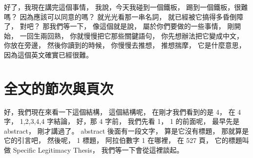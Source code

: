 \hypertarget{w02:cue:254}{}好了，我現在講完這個事情，
\hypertarget{w02:cue:255}{}我說，今天我碰到一個鐵板，
\hypertarget{w02:cue:256}{}踢到一個鐵板，很難嗎？
\hypertarget{w02:cue:257}{}因為應該可以同意的嗎？
\hypertarget{w02:cue:258}{}就光光看那一串名詞，
\hypertarget{w02:cue:259}{}就已經被它搞得多昏倒障了，
\hypertarget{w02:cue:260}{}對吧？
\hypertarget{w02:cue:261}{}那我們等一下，
\hypertarget{w02:cue:262}{}像這個就是說，
\hypertarget{w02:cue:263}{}屬於你們要做的一些事情，
\hypertarget{w02:cue:264}{}剛開始，
\hypertarget{w02:cue:265}{}一回生兩回熟，
\hypertarget{w02:cue:266}{}你就慢慢把它那些關鍵語句，
\hypertarget{w02:cue:267}{}你先想辦法把它變成中文，
\hypertarget{w02:cue:268}{}你放在旁邊，
\hypertarget{w02:cue:269}{}然後你讀到的時候，
\hypertarget{w02:cue:270}{}你慢慢去推想，
\hypertarget{w02:cue:271}{}推想揣摩，
\hypertarget{w02:cue:272}{}它是什麼意思，
\hypertarget{w02:cue:273}{}因為這個英文確實已經很難。

\section{全文的節次與頁次}

\hypertarget{w02:cue:274}{}好，我們現在來看一下這個結構，
\hypertarget{w02:cue:275}{}這個結構呢，
\hypertarget{w02:cue:276}{}在剛才我們看到的是 4，
\hypertarget{w02:cue:277}{}在 4 字，
\hypertarget{w02:cue:278}{}1,2,3,4,4 字結論，
\hypertarget{w02:cue:279}{}好，那 4 字前，
\hypertarget{w02:cue:280}{}我們先看 1，
\hypertarget{w02:cue:281}{}1 的前面呢，
\hypertarget{w02:cue:282}{}最早先是 abstract，
\hypertarget{w02:cue:283}{}剛才講過了。
\hypertarget{w02:cue:284}{}abstract 後面有一段文字，
\hypertarget{w02:cue:285}{}算是它沒有標題，
\hypertarget{w02:cue:286}{}那就算是它的引言吧，
\hypertarget{w02:cue:287}{}然後呢，
\hypertarget{w02:cue:288}{}1 標題，
\hypertarget{w02:cue:289}{}阿拉伯數字 1 在哪裡，
\hypertarget{w02:cue:290}{}在 527 頁，
\hypertarget{w02:cue:291}{}它的標題叫做
\hypertarget{w02:cue:292}{}Specific Legitimacy Thesis，
\hypertarget{w02:cue:293}{}我們等一下會從這裡談起。

